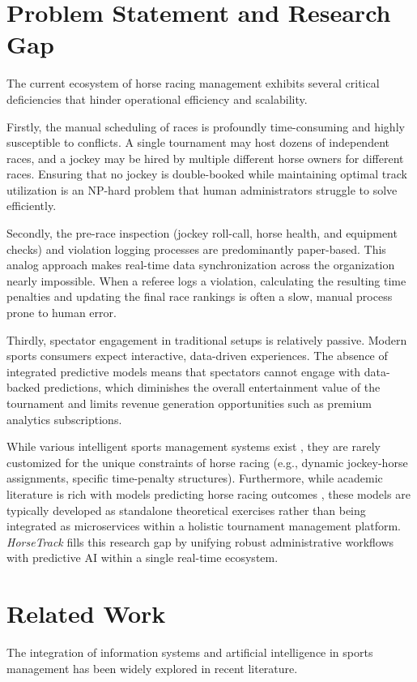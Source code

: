\documentclass{llncs}
\begin{document}
\section{Problem Statement and Research Gap}
The current ecosystem of horse racing management exhibits several critical deficiencies that hinder operational efficiency and scalability. 

Firstly, the manual scheduling of races is profoundly time-consuming and highly susceptible to conflicts. A single tournament may host dozens of independent races, and a jockey may be hired by multiple different horse owners for different races. Ensuring that no jockey is double-booked while maintaining optimal track utilization is an NP-hard problem that human administrators struggle to solve efficiently.

Secondly, the pre-race inspection (jockey roll-call, horse health, and equipment checks) and violation logging processes are predominantly paper-based. This analog approach makes real-time data synchronization across the organization nearly impossible. When a referee logs a violation, calculating the resulting time penalties and updating the final race rankings is often a slow, manual process prone to human error.

Thirdly, spectator engagement in traditional setups is relatively passive. Modern sports consumers expect interactive, data-driven experiences. The absence of integrated predictive models means that spectators cannot engage with data-backed predictions, which diminishes the overall entertainment value of the tournament and limits revenue generation opportunities such as premium analytics subscriptions.

While various intelligent sports management systems exist \cite{ref_isms,ref_wiley}, they are rarely customized for the unique constraints of horse racing (e.g., dynamic jockey-horse assignments, specific time-penalty structures). Furthermore, while academic literature is rich with models predicting horse racing outcomes \cite{ref_benter,ref_doi_1,ref_nyc_blog,ref_pmc_predict}, these models are typically developed as standalone theoretical exercises rather than being integrated as microservices within a holistic tournament management platform. \textit{HorseTrack} fills this research gap by unifying robust administrative workflows with predictive AI within a single real-time ecosystem.

\section{Related Work}
The integration of information systems and artificial intelligence in sports management has been widely explored in recent literature.
\end{document}
